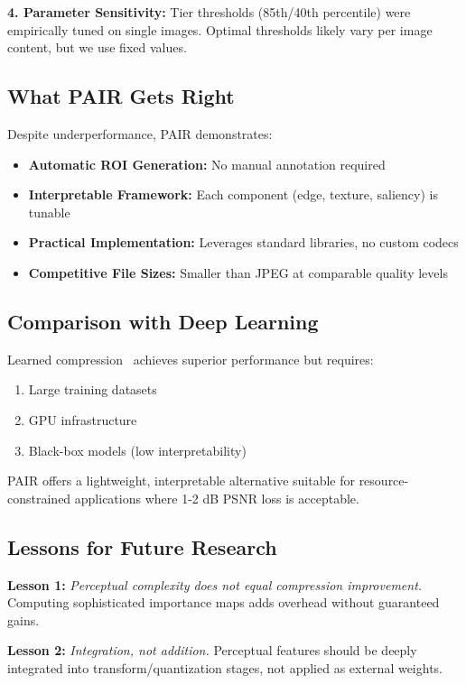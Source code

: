 \documentclass[conference]{IEEEtran}
\begin{document}
\textbf{4. Parameter Sensitivity:} Tier thresholds (85th/40th percentile) were empirically tuned on single images. Optimal thresholds likely vary per image content, but we use fixed values.

\subsection{What PAIR Gets Right}

Despite underperformance, PAIR demonstrates:

\begin{itemize}
    \item \textbf{Automatic ROI Generation:} No manual annotation required
    \item \textbf{Interpretable Framework:} Each component (edge, texture, saliency) is tunable
    \item \textbf{Practical Implementation:} Leverages standard libraries, no custom codecs
    \item \textbf{Competitive File Sizes:} Smaller  than JPEG at comparable quality levels
\end{itemize}

\subsection{Comparison with Deep Learning}

Learned compression~\cite{balle2018variational} achieves superior performance but requires:
\begin{enumerate}
    \item Large training datasets
    \item GPU infrastructure
    \item Black-box models (low interpretability)
\end{enumerate}

PAIR offers a lightweight, interpretable alternative suitable for resource-constrained applications where 1-2 dB PSNR loss is acceptable.

\subsection{Lessons for Future Research}

\textbf{Lesson 1:} \textit{Perceptual complexity does not equal compression improvement.} Computing sophisticated importance maps adds overhead without guaranteed gains.

\textbf{Lesson 2:} \textit{Integration, not addition.} Perceptual features should be deeply integrated into transform/quantization stages, not applied as external weights.
\end{document}

